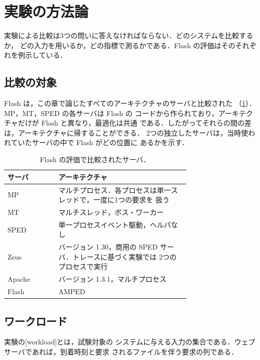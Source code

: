 \documentclass[../main.tex]{subfiles}
\begin{document}
\section{実験の方法論}
\label{sec:l06-methodology}

実験による比較は3つの問いに答えなければならない．どのシステムを比較するか，
どの入力を用いるか，どの指標で測るかである．Flash の評価はそのそれぞれを例示している．

\subsection{比較の対象}

Flash は，この章で論じたすべてのアーキテクチャのサーバと比較された
（\cref{tab:l06-comparison-points}）．MP，MT，SPED の各サーバは Flash の
コードから作られており，アーキテクチャだけが Flash と異なり，最適化は共通
である．したがってそれらの間の差は，アーキテクチャに帰することができる．
2つの独立したサーバは，当時使われていたサーバの中で Flash がどの位置に
あるかを示す．

\begin{table}[htbp]
  \centering
  \caption{Flash の評価で比較されたサーバ．}
  \label{tab:l06-comparison-points}
  \small
  \begin{tabular}{@{}l>{\raggedright\arraybackslash}p{0.72\linewidth}@{}}
    \toprule
    サーバ & アーキテクチャ \\
    \midrule
    MP     & マルチプロセス．各プロセスは単一スレッドで，一度に1つの要求を
             扱う \\
    MT     & マルチスレッド，ボス・ワーカー \\
    SPED   & 単一プロセスイベント駆動，ヘルパなし \\
    Zeus   & バージョン 1.30，商用の SPED サーバ．トレースに基づく実験では
             2つのプロセスで実行 \\
    Apache & バージョン 1.3.1，マルチプロセス \\
    Flash  & AMPED \\
    \bottomrule
  \end{tabular}
\end{table}

\subsection{ワークロード}

\begin{definition}[ワークロード]
  実験の[workload]とは，試験対象の
  システムに与える入力の集合である．ウェブサーバであれば，到着時刻と要求
  されるファイルを伴う要求の列である．
\end{definition}
\end{document}
